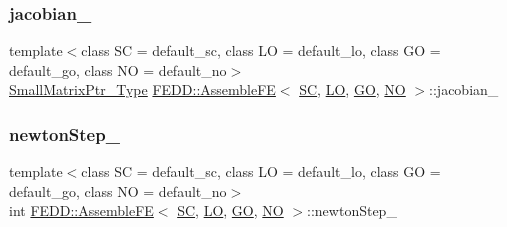 \subsubsection{\texorpdfstring{jacobian\+\_\+}{jacobian\_}}
{\footnotesize\ttfamily template$<$class SC  = default\+\_\+sc, class LO  = default\+\_\+lo, class GO  = default\+\_\+go, class NO  = default\+\_\+no$>$ \\
\hyperlink{classFEDD_1_1AssembleFE_afb5fb5dca3aab59f697a25884e99e894}{Small\+Matrix\+Ptr\+\_\+\+Type} \hyperlink{classFEDD_1_1AssembleFE}{F\+E\+D\+D\+::\+Assemble\+FE}$<$ \hyperlink{fe__test__laplace_8cpp_a79c7e86a57edbb2a5a53242bcd04e41e}{SC}, \hyperlink{fe__test__laplace_8cpp_ad6a38c9f07d3fd633eefca5bccad8410}{LO}, \hyperlink{fe__test__laplace_8cpp_afa2946b509009b4f45eb04bd8c5b27d9}{GO}, \hyperlink{fe__test__laplace_8cpp_a5e24f37b28787429872b6ecb1d0417ce}{NO} $>$\+::jacobian\+\_\+\hspace{0.3cm}{\ttfamily [protected]}}

\mbox{\label{classFEDD_1_1AssembleFE_a39520c726ee8a6a48258adc555f6df77}} 
\subsubsection{\texorpdfstring{newton\+Step\+\_\+}{newtonStep\_}}
{\footnotesize\ttfamily template$<$class SC  = default\+\_\+sc, class LO  = default\+\_\+lo, class GO  = default\+\_\+go, class NO  = default\+\_\+no$>$ \\
int \hyperlink{classFEDD_1_1AssembleFE}{F\+E\+D\+D\+::\+Assemble\+FE}$<$ \hyperlink{fe__test__laplace_8cpp_a79c7e86a57edbb2a5a53242bcd04e41e}{SC}, \hyperlink{fe__test__laplace_8cpp_ad6a38c9f07d3fd633eefca5bccad8410}{LO}, \hyperlink{fe__test__laplace_8cpp_afa2946b509009b4f45eb04bd8c5b27d9}{GO}, \hyperlink{fe__test__laplace_8cpp_a5e24f37b28787429872b6ecb1d0417ce}{NO} $>$\+::newton\+Step\+\_\+\hspace{0.3cm}{\ttfamily [protected]}}

\mbox{\label{classFEDD_1_1AssembleFE_ab2892bff598d5a4f784d4f30ddf4836c}} 
